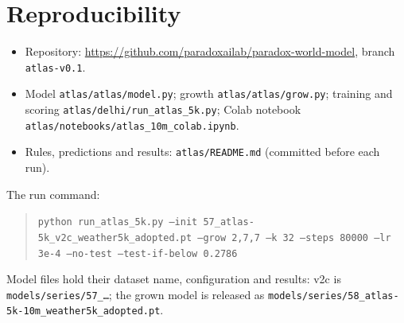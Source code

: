 \documentclass{article}
\begin{document}
\section{Reproducibility}
\begin{itemize}
\item Repository: \url{https://github.com/paradoxailab/paradox-world-model}, branch \texttt{atlas-v0.1}.
\item Model \texttt{atlas/atlas/model.py}; growth \texttt{atlas/atlas/grow.py}; training and scoring
\texttt{atlas/delhi/run\_atlas\_5k.py}; Colab notebook \texttt{atlas/notebooks/atlas\_10m\_colab.ipynb}.
\item Rules, predictions and results: \texttt{atlas/README.md} (committed before each run).
\end{itemize}
The run command:
\begin{quote}\small\texttt{python run\_atlas\_5k.py --init 57\_atlas-5k\_v2c\_weather5k\_adopted.pt --grow 2,7,7 --k 32
--steps 80000 --lr 3e-4 --no-test --test-if-below 0.2786}\end{quote}
Model files hold their dataset name, configuration and results: v2c is \texttt{models/series/57\_\ldots}; the grown
model is released as \texttt{models/series/58\_atlas-5k-10m\_weather5k\_adopted.pt}.



\end{document}
